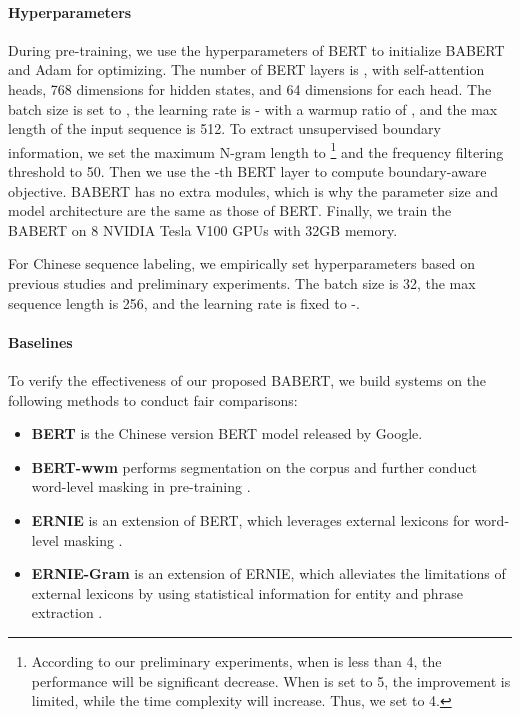 \documentclass[11pt]{article}
\begin{document}
\begin{CJK}{UTF8}{gbsn}
\paragraph{Hyperparameters}
During pre-training, we use the hyperparameters of BERT to initialize BABERT and Adam \cite{kingma2014adam} for optimizing.
The number of BERT layers  is , with  self-attention heads,
768 dimensions for hidden states, and 64 dimensions for each head.
The batch size is set to , the learning rate is - with a warmup ratio of , and the max length of the input sequence is 512.
To extract unsupervised boundary information, we set the maximum N-gram length  to 
\footnote{According to our preliminary experiments, when  is less than 4, the performance will be significant decrease. When  is set to 5, the improvement is limited, while the time complexity will increase. Thus, we set  to 4.}
and the frequency filtering threshold to 50.
Then we use the -th BERT layer to compute boundary-aware objective.
BABERT has no extra modules, which is why the parameter size and model architecture are the same as those of BERT.
Finally, we train the BABERT on 8 NVIDIA Tesla V100 GPUs with 32GB memory.

For Chinese sequence labeling, we empirically set hyperparameters based on previous studies \cite{jia-etal-2020-entity,liu-etal-2021-lexicon} and preliminary experiments.
The batch size is 32, the max sequence length is 256, and the learning rate is fixed to -.


\paragraph{Baselines}
To verify the effectiveness of our proposed BABERT, we build systems on the following methods to conduct fair comparisons:

\begin{itemize}
  \item \textbf{BERT} is the Chinese version BERT model released by Google.

  \item \textbf{BERT-wwm} performs segmentation on the corpus and further conduct word-level masking in pre-training \cite{cui2021pre}.

  \item \textbf{ERNIE} is an extension of BERT, which leverages external lexicons for word-level masking \cite{sun2019ernie}.

  \item \textbf{ERNIE-Gram} is an extension of ERNIE,
  which alleviates the limitations of external lexicons by using statistical information for entity and phrase extraction \cite{xiao-etal-2021-ernie}.


\end{itemize}
\end{CJK}
\end{document}
